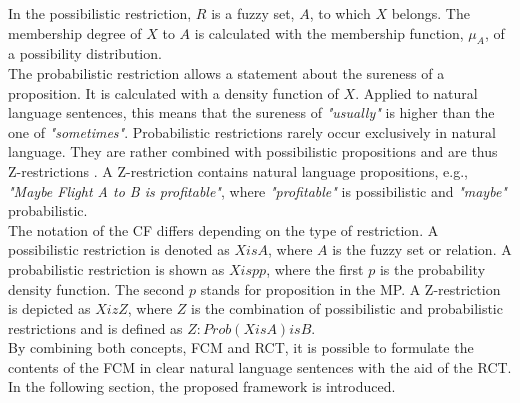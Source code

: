 \documentclass[conference]{IEEEtran}
\begin{document}
In the possibilistic restriction, \begin{math} R \end{math} is a fuzzy set, \begin{math} A \end{math}, to which \begin{math} X \end{math} belongs. The membership degree of \begin{math} X \end{math} to \begin{math} A \end{math} is calculated with the membership function, \begin{math} \mu_{A} \end{math}, of a possibility distribution.\\
The probabilistic restriction allows a statement about the sureness of a proposition. It is calculated with a density function of \begin{math} X \end{math}. Applied to natural language sentences, this means that the sureness of \emph{"usually"} is higher than the one of \emph{"sometimes"}. Probabilistic restrictions rarely occur exclusively in natural language. They are rather combined with possibilistic propositions and are thus Z-restrictions \cite{zadeh2013}. A Z-restriction contains natural language propositions, e.g., \emph{"Maybe Flight A to B is profitable"}, where \emph{"profitable"} is possibilistic and \emph{"maybe"} probabilistic.\\
The notation of the CF differs depending on the type of restriction. A possibilistic restriction is denoted as \begin{math} X is A \end{math}, where \begin{math} A \end{math} is the fuzzy set or relation. A probabilistic restriction is shown as \begin{math} X isp p \end{math}, where the first \begin{math} p \end{math} is the probability density function. The second \begin{math} p \end{math} stands for proposition in the MP. A Z-restriction is depicted as \begin{math} X iz Z \end{math}, where \begin{math} Z \end{math} is the combination of possibilistic and probabilistic restrictions and is defined as \begin{math} Z: Prob(X is A) is B \end{math}.\\
By combining both concepts, FCM and RCT, it is possible to formulate the contents of the FCM in clear natural language sentences with the aid of the RCT. In the following section, the proposed framework is introduced.
\end{document}
